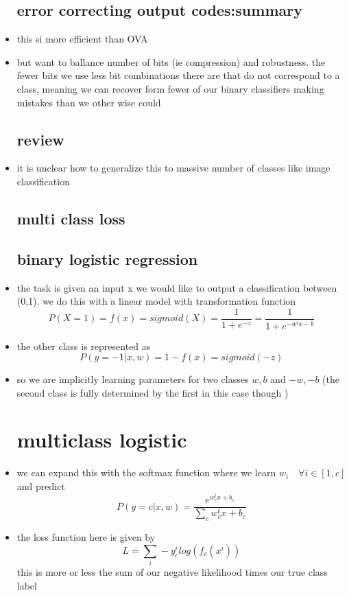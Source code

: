\documentclass{article}
\begin{document}
\begin{itemize}
\subsection*{error correcting output codes:summary}
\item this si more efficient than OVA
\item but want to ballance number of bits (ie compression) and robustness. the fewer bits we use less bit combinations there are that do not correspond to a class, meaning we can recover form fewer of our binary classifiers making mistakes than we other wise could
\subsection*{review}
\item it is unclear how to generalize this to massive number of classes like image classification
\subsection*{multi class loss}
\subsection*{binary logistic regression}
\item the task is given an input x we would like to output a classification between (0,1). we do this with a linear model with transformation function  $$P(X=1)=f(x)=sigmoid(X)=\frac{1}{1+e^{-z}}=\frac{1}{1+e^{-w^{t}x-b}}$$
\item the other class is represented as $$P(y=-1|x,w)=1-f(x)=sigmoid(-z)$$
\item so we are implicitly learning parameters for two classes $w,b$ and $-w,-b$ (the second class is fully determined by the first in this case though )
\section*{multiclass logistic}
\item we can expand this with the softmax function where we learn $w_i\quad \forall i\in[1,c]$ and predict $$P(y=c|x,w)=\frac{e^{w_{c}^{t}x+b_c}}{\sum_{c}w^t_cx+b_c}$$
\item the loss function here is given by $$L=\sum_{i}-y_{c}^{i}log(f_{c}(x^{i}))$$ this is more or less the sum of our negative likelihood times our true class label 

\end{itemize}
\end{document}
